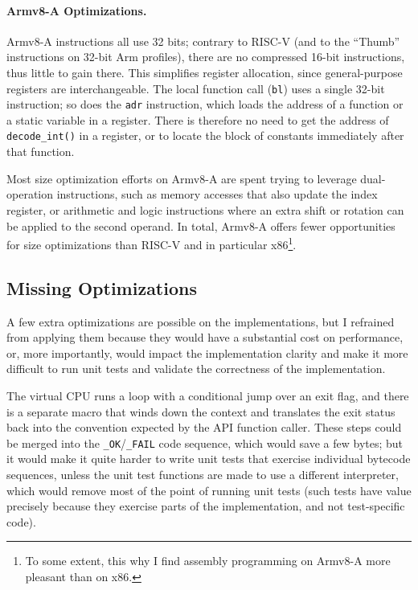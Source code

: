 \documentclass{llncs}
\begin{document}
\paragraph{Armv8-A Optimizations.}
Armv8-A instructions all use 32 bits; contrary to RISC-V (and to the
``Thumb'' instructions on 32-bit Arm profiles), there are no compressed
16-bit instructions, thus little to gain there. This simplifies register
allocation, since general-purpose registers are interchangeable. The
local function call (\verb+bl+) uses a single 32-bit instruction; so does
the \verb+adr+ instruction, which loads the address of a function or a
static variable in a register. There is therefore no need to get the
address of \verb+decode_int()+ in a register, or to locate the block of
constants immediately after that function.

Most size optimization efforts on Armv8-A are spent trying to leverage
dual-operation instructions, such as memory accesses that also update
the index register, or arithmetic and logic instructions where an extra
shift or rotation can be applied to the second operand. In total,
Armv8-A offers fewer opportunities for size optimizations than RISC-V
and in particular x86\footnote{To some extent, this why I find assembly
programming on Armv8-A more pleasant than on x86.}.

\subsection{Missing Optimizations}

A few extra optimizations are possible on the implementations, but I
refrained from applying them because they would have a substantial cost
on performance, or, more importantly, would impact the implementation
clarity and make it more difficult to run unit tests and validate the
correctness of the implementation.

The virtual CPU runs a loop with a conditional jump over an exit flag,
and there is a separate macro that winds down the context and translates
the exit status back into the convention expected by the API function
caller. These steps could be merged into the \verb+_OK+/\verb+_FAIL+
code sequence, which would save a few bytes; but it would make it quite
harder to write unit tests that exercise individual bytecode sequences,
unless the unit test functions are made to use a different interpreter,
which would remove most of the point of running unit tests (such tests
have value precisely because they exercise parts of the implementation,
and not test-specific code).
\end{document}
